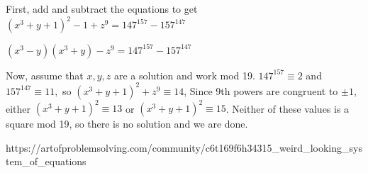 \documentclass[a4paper]{article}
\begin{document}
\begin{question}[]{}
{    First, add and subtract the equations to get
    $(x^3+y+1)^2-1+z^9=147^{157}-157^{147}$

    $(x^3-y)(x^3+y)-z^9=147^{157}-157^{147}$

    Now, assume that $x,y,z$ are a solution and work mod 19. $147^{157}\equiv2$ and $157^{147}\equiv11,$ so
    $(x^3+y+1)^2+z^9\equiv14$,
    Since 9th powers are congruent to $\pm1$, either $(x^3+y+1)^2\equiv13$ or $(x^3+y+1)^2\equiv15$. Neither of these values is a square mod 19, so there is no solution and we are done.
    }{%
    https://artofproblemsolving.com/community/c6t169f6h34315_weird_looking_system_of_equations
  }
\end{question}
\end{document}
